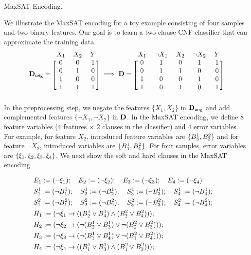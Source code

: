 \begin{example}{MaxSAT Encoding.}
\normalfont

We illustrate the MaxSAT encoding for a toy example consisting of four samples and two binary features. Our goal is to learn a two clause CNF classifier that can approximate the training data. 
\[ 
\dataset_\mathsf{orig} = 
\begin{blockarray}{ccc}
X_1 & X_2 & Y\\
\begin{block}{[ccc]}
0 & 0 & 1\\
0 & 1 & 0\\
1 & 0 & 0\\
1 & 1 & 1\\
\end{block}
\end{blockarray} \implies 
\dataset = 
\begin{blockarray}{ccccc}
X_1 & \neg X_1 & X_2  & \neg X_2 & Y\\
\begin{block}{[ccccc]}
0 & 1 & 0 & 1 & 1\\
0 & 1 & 1 & 0 & 0\\
1 & 0 & 0 & 1 & 0\\
1 & 0 & 1 & 0 & 1\\
\end{block}
\end{blockarray}
\]
In the preprocessing step, we negate the features $ \{X_1, X_2\} $ in $ \mathbf{D}_\mathsf{orig} $ and add complemented features $ \{\neg X_1, \neg X_2\} $ in $ \mathbf{D} $. In the MaxSAT encoding, we define $ 8 $ feature variables ($ 4 $ features $ \times $ $ 2 $ clauses in the classifier) and $ 4 $ error variables. For example, for feature $ X_2 $, introduced feature variables are $ \{B^1_3, B^2_3\} $ and for feature $ \neg X_2 $, introduced variables are $ \{B^1_4, B^2_4\} $. For four samples, error variables are $ \{\xi_1, \xi_2, \xi_3, \xi_4\} $. We next show the soft and hard clauses in the MaxSAT encoding


\[
\begin{split}
&E_1:= (\neg \xi_1); \quad
E_2:= (\neg \xi_2); \quad E_3:= (\neg \xi_3); \quad
E_4:= (\neg \xi_4)\\
& S_1^1 := (\neg B_1^1);\quad 
 S^1_2 := (\neg B^1_2);\quad 
 S^1_3 := (\neg B^1_3);\quad
 S^1_4 := (\neg B^1_4);\quad \\ 
& S_1^2 := (\neg B_1^2);\quad 
S^2_2 := (\neg B^2_2);\quad 
S^2_3 := (\neg B^2_3);\quad 
S^2_4 := (\neg B^2_4);\quad\\ 
& H_1:= (\neg \xi_1 \rightarrow ((B_2^1 \vee B_4^1)\wedge (B_2^2 \vee B_4^2)));\\
& H_2:= (\neg \xi_2 \rightarrow (\neg(B_2^1 \vee B_3^1) \vee \neg(B_2^2 \vee B_3^2)));\\
& H_3:= (\neg \xi_3 \rightarrow (\neg (B_1^1 \vee B_4^1) \vee \neg(B_1^2 \vee B_4^2)));\\
& H_4:= (\neg \xi_4 \rightarrow ((B_1^1 \vee B_3^1) \wedge (B_1^2 \vee B_3^2)));\\
\end{split}
\]


\end{example}
